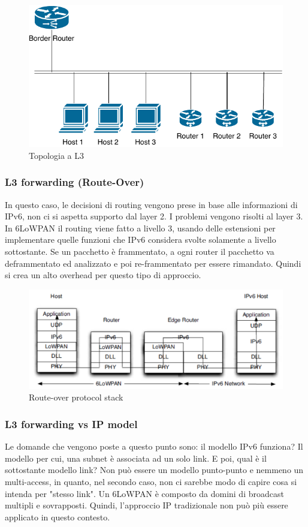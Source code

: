 \documentclass{article}
\begin{document}
\begin{figure}[H]
\centering
\includegraphics[scale=0.4]{figures/topologia L3.pdf}
\caption{Topologia a L3}
\end{figure}

\subsubsection{L3 forwarding (Route-Over)}
In questo caso, le decisioni di routing vengono prese in base alle informazioni di IPv6, non ci si aspetta supporto dal layer 2. I problemi vengono risolti al layer 3. In 6LoWPAN il routing viene fatto a livello 3, usando delle estensioni per implementare quelle funzioni che IPv6 considera svolte solamente a livello sottostante. Se un pacchetto è frammentato, a ogni router il pacchetto va deframmentato ed analizzato e poi re-frammentato per essere rimandato. Quindi si crea un alto overhead per questo tipo di approccio.
\begin{figure}[H]
\centering
\includegraphics[scale=0.4]{figures/L3 forwarding.png}
\caption{Route-over protocol stack}
\end{figure}

\subsubsection{L3 forwarding vs IP model}
Le domande che vengono poste a questo punto sono: il modello IPv6 funziona? Il modello per cui, una subnet è associata ad un solo link. E poi, qual è il sottostante modello link? Non può essere un modello punto-punto e nemmeno un multi-access, in quanto, nel secondo caso, non ci sarebbe modo di capire cosa si intenda per "stesso link". Un 6LoWPAN è composto da domini di broadcast multipli e sovrapposti. Quindi, l'approccio IP tradizionale non può più essere applicato in questo contesto. 
\end{document}
